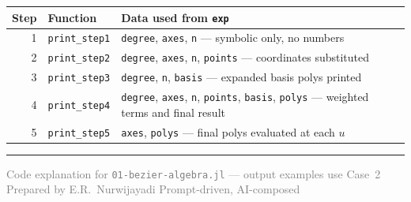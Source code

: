 \documentclass[12pt, a4paper]{article}
\newcommand{\cd}[1]{\texttt{#1}}
\begin{document}
\begin{center}
\begin{tabular}{rp{4cm}p{6cm}}
\toprule
Step & Function & Data used from \cd{exp} \\
\midrule
1 & \cd{print\_step1} &
  \cd{degree}, \cd{axes}, \cd{n} --- symbolic only, no numbers \\
2 & \cd{print\_step2} &
  \cd{degree}, \cd{axes}, \cd{n}, \cd{points} --- coordinates substituted \\
3 & \cd{print\_step3} &
  \cd{degree}, \cd{n}, \cd{basis} --- expanded basis polys printed \\
4 & \cd{print\_step4} &
  \cd{degree}, \cd{axes}, \cd{n}, \cd{points}, \cd{basis}, \cd{polys} ---
  weighted terms and final result \\
5 & \cd{print\_step5} &
  \cd{axes}, \cd{polys} --- final polys evaluated at each $u$ \\
\bottomrule
\end{tabular}
\end{center}

\vspace{2em}\hrule\vspace{0.5em}
{\small\textcolor{gray}{Code explanation for \texttt{01-bezier-algebra.jl} --- output examples use Case~2 \textbar{} Prepared by E.R.\ Nurwijayadi \textbar{} Prompt-driven, AI-composed}}
\end{document}
